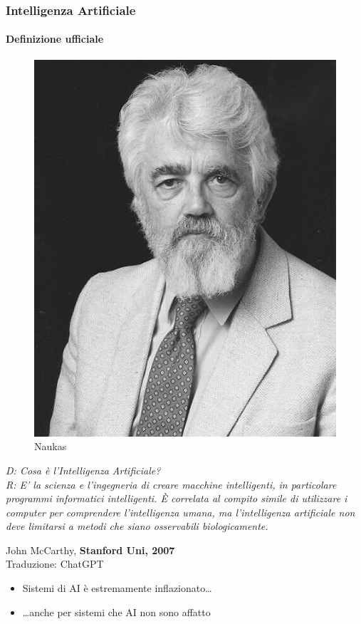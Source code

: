 \begin{frame}[t] \frametitle{Intelligenza Artificiale}
{\scriptsize
	\onslide<1->
		\framesubtitle{Definizione ufficiale}
		\vspace*{.3cm}
		\begin{minipage}[t]{\textwidth}
			\begin{minipage}[t]{0.45\textwidth}
				\centering
				\begin{figure}[ht]
					\includegraphics[width=.73\textwidth]{img/John-McCarthy.jpg}
					{\tiny\\\textcopyright Naukas}
				\end{figure}
			\end{minipage}
		    \begin{minipage}[t]{0.5\textwidth}
				\renewcommand{\epigraphsize}{\small}
				\setlength{\afterepigraphskip}{0pt}
				\setlength{\beforeepigraphskip}{5pt}
				\setlength{\epigraphwidth}{\textwidth}
				\epigraph{
					\textit{\alert{D:} Cosa è l'Intelligenza Artificiale?\\
					\alert{R:} E' la scienza e l'ingegneria di creare macchine intelligenti, in particolare programmi informatici intelligenti. È correlata al compito simile di utilizzare i computer per comprendere l'intelligenza umana, ma l'intelligenza artificiale non deve limitarsi a metodi che siano osservabili biologicamente.}}{John McCarthy, \textbf{Stanford Uni, 2007}\\Traduzione: \textcopyright ChatGPT}
			\end{minipage}
		\end{minipage}
}
	\begin{itemize}[leftmargin=10pt,align=right]
		\item[\alert{\faHandORight}] Sistemi di AI è estremamente inflazionato\ldots 
		\onslide<3->\item[\alert{\faHandORight}] \ldots anche per sistemi che AI non sono affatto
	\end{itemize}
\end{frame}
